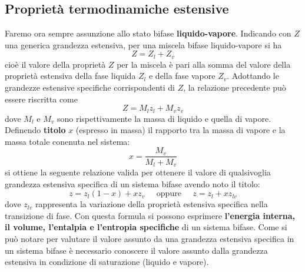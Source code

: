 \subsection{Proprietà termodinamiche estensive}
Faremo ora sempre assunzione allo stato bifase \textbf{liquido-vapore}.\newline
\newline
Indicando con $Z$ una generica grandezza estensiva, per una miscela bifase liquido-vapore si ha
\[
    Z = Z_l + Z_v
\]
cioè il valore della proprietà $Z$ per la miscela è pari alla somma del valore della proprietà estensiva della fase liquida $Z_l$ e della fase vapore $Z_v$. Adottando le grandezze estensive specifiche corrispondenti di $Z$, la relazione precedente può essere riscritta come 
\[
    Z = M_l z_l + M_v z_v
\]
dove $M_l$ e $M_v$ sono rispettivamente la massa di liquido e quella di vapore.\newline
\newline
Definendo \textbf{titolo} $x$ (espresso in massa) il rapporto tra la massa di vapore e la massa totale conenuta nel sistema:
\[
    x = \frac{M_v}{M_l+M_v}
\]
si ottiene la seguente relazione valida per ottenere il valore di qualsivoglia grandezza
estensiva specifica di un sistema bifase avendo noto il titolo: 
\[
    z = z_l(1-x) + xz_v \;\;\;\;\;\text{oppure}\;\;\;\;\; z = z_l + x z_{lv}
\]
dove $z_{lv}$ rappresenta la variazione della proprietà estensiva specifica nella transizione di fase. \newline
Con questa formula si possono esprimere \textbf{l'energia interna, il volume, l'entalpia e l'entropia specifiche} di un sistema bifase.\newline
\newline
Come si può notare per valutare il valore assunto da una grandezza estensiva specifica in un
sistema bifase è necessario conoscere il valore assunto dalla grandezza estensiva in
condizione di saturazione (liquido e vapore).
